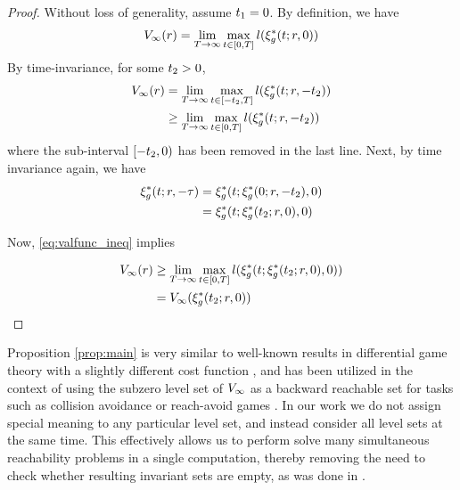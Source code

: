 \begin{proof}
Without loss of generality, assume $t_1=0$. By definition, we have
\begin{equation}
\begin{aligned}
V_\infty(r) & = \lim_{T\rightarrow\infty}\max_{t \in [0, T]} l(\xi_g^*(t; r, 0))\\
\end{aligned}
\end{equation}
By time-invariance, for some $t_2 > 0$,
\begin{equation}
\label{eq:valfunc_ineq}
  \begin{aligned}
V_\infty(r) &= \lim_{T\rightarrow\infty}\max_{t \in [-t_2, T]} l(\xi_g^*(t; r, -t_2)) \\
&\ge \lim_{T\rightarrow\infty}\max_{t \in [0, T]} l(\xi_g^*(t; r, -t_2)) 
  \end{aligned}
\end{equation}  
\noindent where the sub-interval $[-t_2, 0)$ has been removed in the last line. Next, by time invariance again, we  have
\begin{equation}
\begin{aligned}
\xi_g^*(t; r, -\tau) &= \xi_g^*(t; \xi_g^*(0; r, -t_2), 0) \\
&= \xi_g^*(t; \xi_g^*(t_2; r, 0), 0)
\end{aligned}
\end{equation}

Now, \eqref{eq:valfunc_ineq} implies

\begin{equation}
\begin{aligned}
V_\infty(r) &\ge \lim_{T\rightarrow\infty}\max_{t \in [0, T]} l(\xi_g^*(t; \xi_g^*(t_2; r, 0), 0)) \\
&= V_\infty(\xi_g^*(t_2; r, 0))
\end{aligned}
\end{equation} 
\end{proof} 

 
 
 \begin{rem} 
   Proposition \ref{prop:main} is very similar to well-known results in differential game theory with a slightly different cost function \cite{Akametalu2014}, and has been utilized in the context of using the subzero level set of $V_\infty$ as a backward reachable set for tasks such as collision avoidance or reach-avoid games \cite{Mitchell05}. In our work we do not assign special meaning to any particular level set, and instead consider all level sets at the same time. This effectively allows us to perform solve many simultaneous reachability problems in a single computation, thereby removing the need to check whether resulting invariant sets are empty, as was done in \cite{Bansal2017}.
 \end{rem}